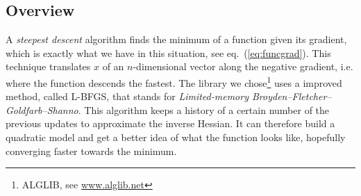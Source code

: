 \documentclass[a4paper,12pt,twoside]{article}
\def \eq#1{eq.~(\ref{#1})}
\begin{document}
\subsection{Overview}
A {\em steepest descent} algorithm finds the minimum of a function given its gradient, which is exactly what we have in this situation, see \eq{eq:funcgrad}. 
This technique translates $x$ of an $n$-dimensional vector along the negative gradient, i.e. where the function descends the fastest.
The library we chose\footnote{ ALGLIB, see \url{www.alglib.net}} uses a  improved method, called L-BFGS, that stands for {\em Limited-memory  Broyden--Fletcher--Goldfarb--Shanno}.
This algorithm keeps a history of a certain number of the previous updates to approximate the inverse Hessian.
It can therefore build a quadratic model and get a better idea of what the function looks like, hopefully converging faster towards the minimum.
\end{document}
